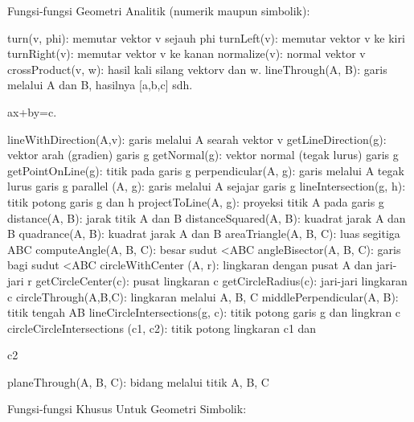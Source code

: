 \documentclass[a4paper,10pt]{article}
\begin{document}
\begin{eulernotebook}
\begin{eulercomment}
\begin{eulercomment}
\begin{eulercomment}
Fungsi-fungsi Geometri Analitik (numerik maupun simbolik):

\end{eulercomment}
\begin{eulerttcomment}
  turn(v, phi): memutar vektor v sejauh phi
  turnLeft(v):   memutar vektor v ke kiri
  turnRight(v):  memutar vektor v ke kanan
  normalize(v): normal vektor v
  crossProduct(v, w): hasil kali silang vektorv dan w.
  lineThrough(A, B): garis melalui A dan B, hasilnya [a,b,c] sdh.
\end{eulerttcomment}
\begin{eulercomment}
ax+by=c.\\
\end{eulercomment}
\begin{eulerttcomment}
  lineWithDirection(A,v): garis melalui A searah vektor v
  getLineDirection(g): vektor arah (gradien) garis g
  getNormal(g): vektor normal (tegak lurus) garis g
  getPointOnLine(g):  titik pada garis g
  perpendicular(A, g):  garis melalui A tegak lurus garis g
  parallel (A, g):  garis melalui A sejajar garis g
  lineIntersection(g, h):  titik potong garis g dan h
  projectToLine(A, g):   proyeksi titik A pada garis g
  distance(A, B):  jarak titik A dan B
  distanceSquared(A, B):  kuadrat jarak A dan B
  quadrance(A, B): kuadrat jarak A dan B
  areaTriangle(A, B, C):  luas segitiga ABC
  computeAngle(A, B, C):   besar sudut <ABC
  angleBisector(A, B, C): garis bagi sudut <ABC
  circleWithCenter (A, r): lingkaran dengan pusat A dan jari-jari r
  getCircleCenter(c):  pusat lingkaran c
  getCircleRadius(c):  jari-jari lingkaran c
  circleThrough(A,B,C):  lingkaran melalui A, B, C
  middlePerpendicular(A, B): titik tengah AB
  lineCircleIntersections(g, c): titik potong garis g dan lingkran c
  circleCircleIntersections (c1, c2):  titik potong lingkaran c1 dan
\end{eulerttcomment}
\begin{eulercomment}
c2\\
\end{eulercomment}
\begin{eulerttcomment}
  planeThrough(A, B, C):  bidang melalui titik A, B, C
\end{eulerttcomment}
\begin{eulercomment}

Fungsi-fungsi Khusus Untuk Geometri Simbolik:


\end{eulercomment}
\end{eulercomment}
\end{eulercomment}
\end{eulernotebook}
\end{document}
